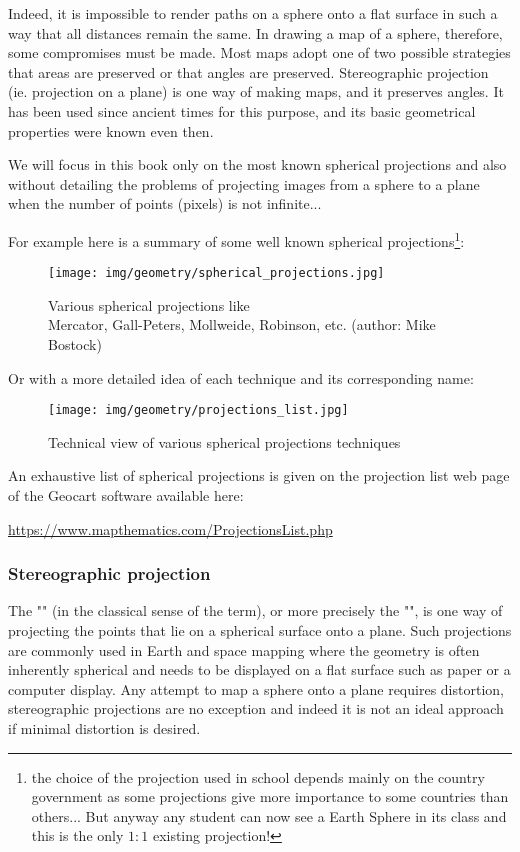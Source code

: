	Indeed, it is impossible to render paths on a sphere onto a flat surface in such a way that all distances remain the same. In drawing a map of a sphere, therefore, some compromises must be made. Most maps adopt one of two possible strategies that areas are preserved or that angles are preserved. Stereographic projection (ie. projection on a plane) is one way of making maps, and it preserves angles. It has been used since ancient times for this purpose, and its basic geometrical properties were known even then.

	We will focus in this book only on the most known spherical projections and also without detailing the problems of projecting images from a sphere to a plane when the number of points (pixels) is not infinite...
	
	For example here is a summary of some well known spherical projections\footnote{the choice of the projection used in school depends mainly on the country government as some projections give more importance to some countries than others... But anyway any student can now see a Earth Sphere in its class and this is the only $1:1$ existing projection!}:
	\begin{figure}[H]
		\centering
		\texttt{[image: img/geometry/spherical\_projections.jpg]}
		\caption[Various spherical projections]{Various spherical projections like \\ Mercator, Gall-Peters, Mollweide, Robinson, etc. (author: Mike Bostock)}
	\end{figure}
	Or with a more detailed idea of each technique and its corresponding name:
	\begin{figure}[H]
		\centering
		\texttt{[image: img/geometry/projections\_list.jpg]}
		\caption{Technical view of various spherical projections techniques}
	\end{figure}
	\begin{tcolorbox}[title=Remark,colframe=black,arc=10pt]
	An exhaustive list of spherical projections is given on the projection list web page of the Geocart software available here: 	
	\begin{center}
	\url{https://www.mapthematics.com/ProjectionsList.php}
	\end{center}
	\end{tcolorbox}
	
	\subsubsection{Stereographic projection}
	The "" (in the classical sense of the term), or more precisely the "", is one way of projecting the points that lie on a spherical surface onto a plane. Such projections are commonly used in Earth and space mapping where the geometry is often inherently spherical and needs to be displayed on a flat surface such as paper or a computer display. Any attempt to map a sphere onto a plane requires distortion, stereographic projections are no exception and indeed it is not an ideal approach if minimal distortion is desired. 

